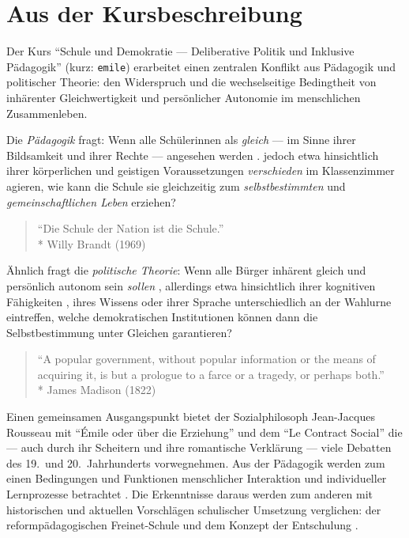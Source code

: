 \section[Kursbeschreibung]{Aus der Kursbeschreibung}

Der Kurs ``Schule und Demokratie --- Deliberative Politik und Inklusive Pädagogik'' (kurz: \lstinline{emile}) erarbeitet einen zentralen Konflikt aus Pädagogik und politischer Theorie:
den Widerspruch und die wechselseitige Bedingtheit von inhärenter Gleichwertigkeit und persönlicher Autonomie im menschlichen Zusammenleben.

Die \emph{Pädagogik} fragt:
Wenn alle Schülerinnen als \emph{gleich} --- im Sinne ihrer Bildsamkeit und ihrer Rechte --- angesehen werden \parencites[vgl.][]{UN-2008,benner-2012}.
jedoch etwa hinsichtlich ihrer körperlichen und geistigen Voraussetzungen \emph{verschieden} im Klassenzimmer agieren, wie kann die Schule sie gleichzeitig zum \emph{selbstbestimmten} und \emph{gemeinschaftlichen Leben} erziehen?

\begin{quote}
    ``Die Schule der Nation ist die Schule.''\\*
    Willy Brandt (1969)
\end{quote}

Ähnlich fragt die \emph{politische Theorie}:
Wenn alle Bürger inhärent gleich und persönlich autonom sein \emph{sollen} \parencite[etwa][]{Dahl-1989-aa}, allerdings etwa hinsichtlich ihrer kognitiven Fähigkeiten \parencite{Rosenberg-2002-aa}, ihres Wissens \parencite[etwa][]{Converse-1970-aa} oder ihrer Sprache unterschiedlich an der Wahlurne eintreffen, welche demokratischen Institutionen können dann die Selbstbestimmung unter Gleichen garantieren?

\begin{quote}
    ``A popular government, without popular information or the means of acquiring it, is but a prologue to a farce or a tragedy, or perhaps both.''\\*
    James Madison (1822)
\end{quote}

Einen gemeinsamen Ausgangspunkt bietet der Sozialphilosoph Jean-Jacques Rousseau mit ``Émile oder über die Erziehung'' \parencite{Rousseau1762} und dem ``Le Contract Social'' \parencite{Rousseau-1762-b} die --- auch durch ihr Scheitern und ihre romantische Verklärung --- viele Debatten des 19.\ und 20.\ Jahrhunderts vorwegnehmen.
Aus der Pädagogik werden zum einen Bedingungen und Funktionen menschlicher Interaktion und individueller Lernprozesse betrachtet \parencites{siebert-2003,benner-2012,mead-1934en}.
Die Erkenntnisse daraus werden zum anderen mit historischen und aktuellen Vorschlägen schulischer Umsetzung verglichen: der reformpädagogischen Freinet-Schule und dem Konzept der Entschulung \parencites{Freinet1979,Illich-1971}.

